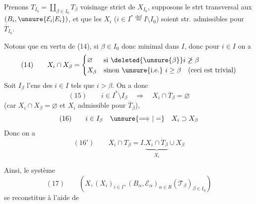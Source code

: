 Prenons $T_{I_0}=\coprod_{\beta\in I_0}T_\beta$ voisinage
 strict
de $X_{I_0}$, supposons le strt transversal aux
$(B_i,\unsure{\mathcal E_i|E_i})$, et  que les $X_i$
($i\in I^*\overset{\mathrm{def}}=I\setminus I_0$)
soient str. admissibles pour $\overline T_{I_0}$.

Notons que en vertu de (14), si $\beta\in I_0$ donc
minimal dans $I$, donc pour $i\in I$ on a
\[
(14)\qquad
X_i\cap X_\beta=
\begin{cases}
\varnothing & \text{si }\deleted{\unsure{\beta}}i\not\ge\beta\\
X_\beta & \text{sinon \unsure{i.e.} }i\ge\beta\quad(\text{ceci est trivial})
\end{cases}
\]
Soit $I_\beta$ l'ens des $i\in I$ tels que $i>\beta$.
On a donc
\[
(15)\qquad i\in I^*\setminus I_\beta\quad\Longrightarrow\quad
X_i\cap\overline T_\beta=\varnothing
\]
(car $X_i\cap X_\beta=\varnothing$ et $X_i$ admissible pour $\overline T_\beta$),
\[
(16)\qquad i\in I_\beta\quad\unsure{\Longrightarrow|=}\quad X_i\supset X_\beta
\]
Donc on a
\[
(16')\qquad X_i\cap T_\beta
=I.\underbrace{X_i\cap\dot T_\beta}_{\dot X_i}\cup X_\beta
\]

Ainsi, le système
\[
(17)\qquad
(X,(X_i)_{i\in I},(B_\alpha,\mathcal E_\alpha)_{\alpha\in R}
(\mathcal T_\beta)_{\beta\in I_0})
\]
se reconstitue à l'aide de

